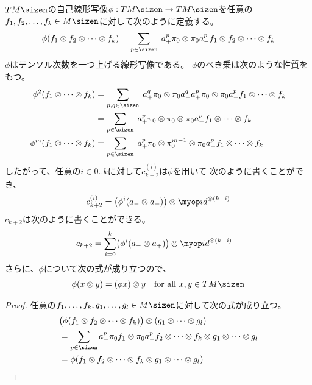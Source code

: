 	$TM\sizen$の自己線形写像$\phi:TM\sizen\to TM\sizen$を任意の
	$f_1,f_2,\dots,f_k\in M\sizen$に対して次のように定義する。
	\begin{equation*}\begin{split} %
		\phi(f_1\otimes f_2\otimes \cdots\otimes f_k) 
		&= \sum_{p\in\sizen}\; a_+^p\pi_0\otimes \pi_0a_-^pf_1\otimes f_2
			\otimes\cdots\otimes f_k \\
	\end{split}\end{equation*} %
	$\phi$はテンソル次数を一つ上げる線形写像である。
	$\phi$のべき乗は次のような性質をもつ。
	\begin{equation*}\begin{split} %
		\phi^2(f_1\otimes\cdots\otimes f_k)
		&= \sum_{p,q\in\sizen}\; a_+^q\pi_0\otimes \pi_0a_-^qa_+^p\pi_0
			\otimes \pi_0a_-^pf_1\otimes\cdots\otimes f_k \\
		&= \sum_{p\in\sizen}\; a_+^p\pi_0\otimes \pi_0\otimes 
			\pi_0a_-^pf_1\otimes\cdots\otimes f_k \\
		\phi^m(f_1\otimes\cdots\otimes f_k)
		&= \sum_{p\in\sizen}\; a_+^p\pi_0\otimes \pi_0^{m-1}\otimes 
			\pi_0a_-^pf_1\otimes\cdots\otimes f_k \\
	\end{split}\end{equation*} %
	したがって、任意の$i\in0..k$に対して$c_{k+2}^{(i)}$は$\phi$を用いて
	次のように書くことができ、
	\begin{equation*}\begin{split} %
		c_{k+2}^{(i)} 
		= \bigl(\phi^i(a_-\otimes a_+)\bigr)\otimes\id^{\otimes(k-i)}
	\end{split}\end{equation*} %
	$c_{k+2}$は次のように書くことができる。
	\begin{equation*}\begin{split} %
		c_{k+2} &= \sum_{i=0}^k
			\bigl(\phi^i(a_-\otimes a_+)\bigr)\otimes\id^{\otimes(k-i)}
	\end{split}\end{equation*} %
	さらに、$\phi$について次の式が成り立つので、
	\begin{equation}\label{eq:phiのライプニッツ則}\begin{split} %
		\phi(x\otimes y)=(\phi x)\otimes y \quad\text{for all }x,y\in TM\sizen
	\end{split}\end{equation} %
	\begin{proof} %
		任意の$f_1,\dots,f_k,g_1,\dots,g_l\in M\sizen$に対して次の式が成り立つ。
		\begin{equation*}\begin{split} %
			&\bigl(\phi(f_1\otimes f_2\otimes\cdots\otimes f_k)\bigr)
				\otimes (g_1\otimes\cdots\otimes g_l) \\
			&= \sum_{p\in\sizen}
				a_-^p\pi_0f_1\otimes \pi_0 a_-^pf_2\otimes\cdots\otimes f_k
				\otimes g_1\otimes\cdots\otimes g_l \\
			&= \phi(f_1\otimes f_2\otimes\cdots\otimes f_k
				\otimes g_1\otimes\cdots\otimes g_l) \\
		\end{split}\end{equation*} %
	\end{proof} %
